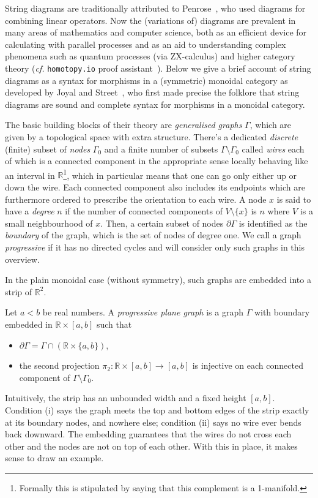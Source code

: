 String diagrams are traditionally attributed to Penrose~\cite{penrose1984spinors}, who used diagrams for combining linear operators.
Now the (variations of) diagrams are prevalent in many areas of mathematics and computer science, both as an efficient device for calculating with parallel processes and as an aid to understanding complex phenomena such as quantum processes (via ZX-calculus) and higher category theory (\textit{cf.} \texttt{homotopy.io} proof assistant~\cite{homotopy_io}).
Below we give a brief account of string diagrams as a syntax for morphisms in a (symmetric) monoidal category as developed by Joyal and Street~\cite{joyal_geometry_1991}, who first made precise the folklore that string diagrams are sound and complete syntax for morphisms in a monoidal category.

The basic building blocks of their theory are \emph{generalised graphs} $\Gamma$, which are given by a topological space with extra structure.
There's a dedicated \emph{discrete} (finite) subset of \emph{nodes} $\Gamma_0$ and a finite number of subsets $\Gamma \setminus \Gamma_0$ called \emph{wires} each of which is a connected component in the appropriate sense locally behaving like an interval in $\mathbb{R}$\footnote{Formally this is stipulated by saying that this complement is a 1-manifold.}, which in particular means that one can go only either up or down the wire.
Each connected component also includes its endpoints which are furthermore ordered to prescribe the orientation to each wire.
A node $x$ is said to have a \emph{degree} $n$ if the number of connected components of $V \setminus \{x\}$ is $n$ where $V$ is a small neighbourhood of $x$.
Then, a certain subset of nodes $\partial \Gamma$ is identified as the \emph{boundary} of the graph, which is the set of nodes of degree one.
We call a graph \emph{progressive} if it has no directed cycles and will consider only such graphs in this overview.

In the plain monoidal case (without symmetry), such graphs are embedded into a strip of $\mathbb{R}^{2}$.
\begin{definition}
Let $a < b$ be real numbers.
A \textit{progressive plane graph} is a graph $\Gamma$ with boundary embedded in $\mathbb{R} \times [a,b]$ such that 
\begin{itemize}
    \item $\partial \Gamma = \Gamma \cap (\mathbb{R} \times \{a,b\})$,
    \item the second projection $\pi_{2} : \mathbb{R} \times [a,b] \to [a,b]$ is injective on each connected component of $\Gamma \setminus \Gamma_0$.
\end{itemize}
\end{definition}
Intuitively, the strip has an unbounded width and a fixed height $[a,b]$.
Condition (i) says the graph meets the top and bottom edges of the strip exactly at its boundary nodes, and nowhere else; condition (ii) says no wire ever bends back downward. 
The embedding guarantees that the wires do not cross each other and the nodes are not on top of each other.
With this in place, it makes sense to draw an example.

